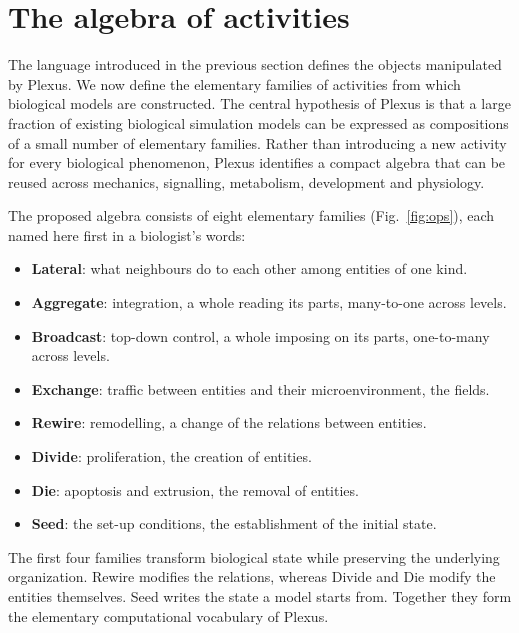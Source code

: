 \documentclass[11pt]{article}
\begin{document}
\section{The algebra of activities}

The language introduced in the previous section defines the objects manipulated by
Plexus. We now define the elementary families of activities from which biological
models are constructed. The central hypothesis of Plexus is that a large fraction of
existing biological simulation models can be expressed as compositions of a small
number of elementary families. Rather than introducing a new activity for every
biological phenomenon, Plexus identifies a compact algebra that can be reused across
mechanics, signalling, metabolism, development and physiology.

The proposed algebra consists of eight elementary families (Fig.~\ref{fig:ops}), each
named here first in a biologist's words:

\begin{itemize}
\item \textbf{Lateral}: what neighbours do to each other among entities of one kind.
\item \textbf{Aggregate}: integration, a whole reading its parts, many-to-one across levels.
\item \textbf{Broadcast}: top-down control, a whole imposing on its parts, one-to-many across levels.
\item \textbf{Exchange}: traffic between entities and their microenvironment, the fields.
\item \textbf{Rewire}: remodelling, a change of the relations between entities.
\item \textbf{Divide}: proliferation, the creation of entities.
\item \textbf{Die}: apoptosis and extrusion, the removal of entities.
\item \textbf{Seed}: the set-up conditions, the establishment of the initial state.
\end{itemize}

The first four families transform biological state while preserving the underlying
organization. Rewire modifies the relations, whereas Divide and Die modify the
entities themselves. Seed writes the state a model starts from. Together they form the
elementary computational vocabulary of Plexus.
\end{document}
